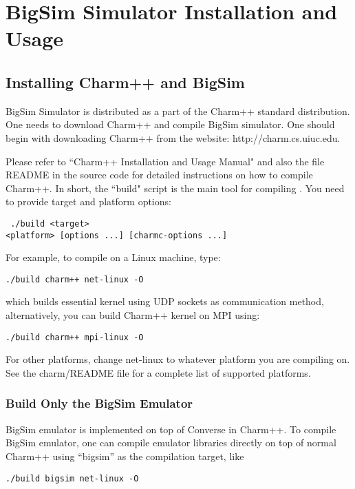 \section{BigSim Simulator Installation and Usage}
\label{install}

\subsection{Installing Charm++ and BigSim}

BigSim Simulator is distributed as a part of the Charm++ standard distribution.
One needs to download Charm++ and compile BigSim simulator.
One should begin with downloading Charm++ from the website:
http://charm.cs.uiuc.edu.

Please refer to ``Charm++ Installation and Usage Manual" and also the file
README in the source code for detailed instructions on how to compile Charm++.
In short, the ``build" script is the main tool for compiling \charmpp{}.  You
need to provide target and platform options: \begin{verbatim} ./build <target>
<platform> [options ...] [charmc-options ...] \end{verbatim}

For example, to compile on a Linux machine, type:
\begin{verbatim}
./build charm++ net-linux -O
\end{verbatim}

which builds essential \charmpp{} kernel using UDP sockets as 
communication method, 
alternatively, you can build Charm++ kernel on MPI using:
\begin{verbatim}
./build charm++ mpi-linux -O
\end{verbatim}

For other platforms, change net-linux to whatever platform you are compiling 
on. See the charm/README file for a complete list of supported platforms.

\subsubsection{Build Only the BigSim Emulator}

BigSim emulator is implemented on top of Converse in Charm++.
To compile BigSim emulator, one can compile emulator libraries
directly on top of normal Charm++ using ``bigsim'' as the compilation
target, like
\begin{verbatim}
./build bigsim net-linux -O
\end{verbatim}

